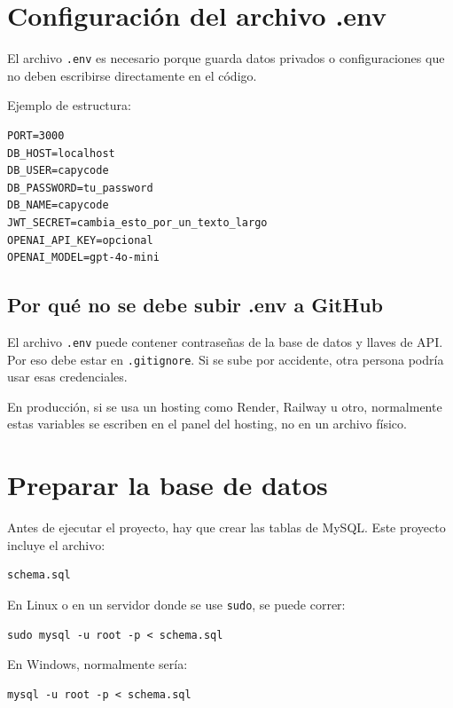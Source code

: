 \documentclass[12pt,letterpaper]{article}
\begin{document}
\section{Configuración del archivo .env}

El archivo \texttt{.env} es necesario porque guarda datos privados o configuraciones que no deben escribirse directamente en el código.

Ejemplo de estructura:

\begin{lstlisting}[style=comandos]
PORT=3000
DB_HOST=localhost
DB_USER=capycode
DB_PASSWORD=tu_password
DB_NAME=capycode
JWT_SECRET=cambia_esto_por_un_texto_largo
OPENAI_API_KEY=opcional
OPENAI_MODEL=gpt-4o-mini
\end{lstlisting}

\subsection{Por qué no se debe subir .env a GitHub}

El archivo \texttt{.env} puede contener contraseñas de la base de datos y llaves de API. Por eso debe estar en \texttt{.gitignore}. Si se sube por accidente, otra persona podría usar esas credenciales.

En producción, si se usa un hosting como Render, Railway u otro, normalmente estas variables se escriben en el panel del hosting, no en un archivo físico.

\section{Preparar la base de datos}

Antes de ejecutar el proyecto, hay que crear las tablas de MySQL. Este proyecto incluye el archivo:

\begin{lstlisting}[style=comandos]
schema.sql
\end{lstlisting}

En Linux o en un servidor donde se use \texttt{sudo}, se puede correr:

\begin{lstlisting}[style=comandos]
sudo mysql -u root -p < schema.sql
\end{lstlisting}

En Windows, normalmente sería:

\begin{lstlisting}[style=comandos]
mysql -u root -p < schema.sql
\end{lstlisting}
\end{document}
